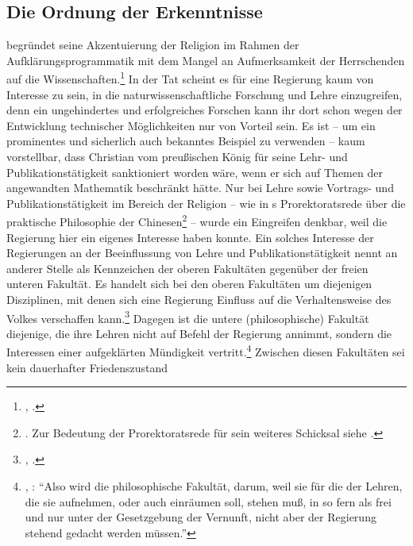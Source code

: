 \subsection{Die Ordnung der Erkenntnisse}
 begründet seine Akzentuierung der Religion im Rahmen der
Aufklärungsprogrammatik mit dem Mangel an Aufmerksamkeit der Herrschenden auf
die Wissenschaften.\footnote{\cite[Vgl.][A
492]{Kant:BeantwortungderFrage:WasistAufklaerung?1977}, \cite[][VIII:
41.10--14]{Kant:GesammelteWerke1900ff.}.} In der Tat scheint es für eine
Regierung kaum von Interesse zu sein, in die naturwissenschaftliche Forschung
und Lehre einzugreifen, denn ein ungehindertes und erfolgreiches Forschen kann
ihr dort schon wegen der Entwicklung technischer Möglichkeiten nur von Vorteil
sein. Es ist -- um ein prominentes und sicherlich auch 
bekanntes Beispiel zu verwenden -- kaum vorstellbar, dass Christian
 vom preußischen König für seine Lehr-
und Publikationstätigkeit sanktioniert worden wäre, wenn er sich auf Themen der
angewandten Mathematik beschränkt hätte.
Nur bei Lehre sowie Vortrags- und Publikationstätigkeit im Bereich der Religion
-- wie in s Prorektoratsrede über die
praktische Philosophie der
Chinesen\footnote{\cite[Vgl.][]{Wolff:OratiodeSinarumphilosophiapractica1988}.
Zur Bedeutung der Prorektoratsrede für sein weiteres Schicksal siehe
\cite[][\pno~xlvi--liii]{Albrecht:Einleitung1988}.} -- wurde ein Eingreifen
denkbar, weil die Regierung hier ein eigenes Interesse haben konnte. Ein solches
Interesse der Regierungen an der Beeinflussung von Lehre und
Publikationstätigkeit nennt  an anderer Stelle als
Kennzeichen der oberen Fakultäten gegenüber der freien unteren Fakultät. Es
handelt sich bei den oberen Fakultäten um diejenigen Disziplinen, mit denen sich
eine Regierung Einfluss auf die Verhaltensweise des Volkes verschaffen
kann.\footnote{\cite[Vgl.][A 6--8]{Kant:DerStreitderFakultaeten1977},
\cite[][VII: 18.30--19.20]{Kant:GesammelteWerke1900ff.}.} Dagegen ist die untere
(philosophische) Fakultät diejenige, die ihre Lehren nicht auf Befehl der
Regierung annimmt, sondern die Interessen einer aufgeklärten Mündigkeit
vertritt.\footnote{\cite[Vgl.][A~~25]{Kant:DerStreitderFakultaeten1977},
\cite[][VII: 27.32-35]{Kant:GesammelteWerke1900ff.}: \enquote{Also wird die
philosophische Fakultät, darum, weil sie für die  der Lehren, die
sie aufnehmen, oder auch einräumen soll, stehen muß, in so fern als frei und nur
unter der Gesetzgebung der Vernunft, nicht aber der Regierung stehend gedacht
werden müssen.}} Zwischen diesen Fakultäten sei kein dauerhafter Friedenszustand
